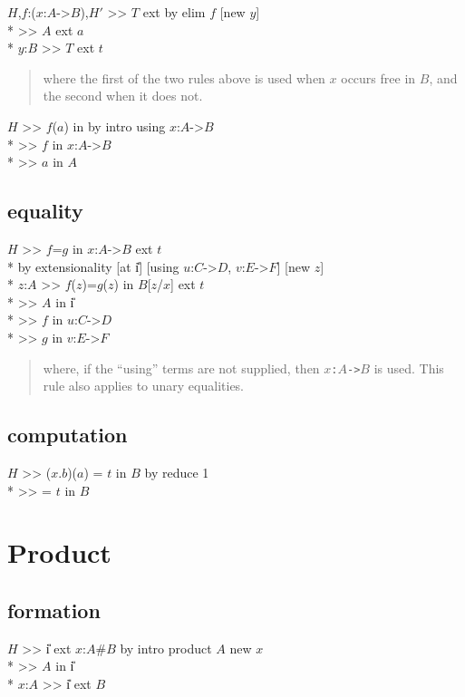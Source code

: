 \goalskip

\goal $H$,$f$:($x$:$A$->$B$),$H'$ >> $T$ ext 
             by elim $f$ [new $y$] \\*
\subgoal >> $A$ ext $a$ \\*
\subgoal $y$:$B$ >> $T$ ext $t$
\begin{quote}\rm
where the first of the two rules above is used when $x$ occurs free
in $B$, and the second when it
does not.
\end{quote}

\goal $H$ >> $f$($a$) in  by intro using $x$:$A$->$B$ \\*
\subgoal >> $f$ in $x$:$A$->$B$ \\*
\subgoal >> $a$ in $A$

\subsection*{equality}
\goal $H$ >> $f$=$g$ in $x$:$A$->$B$ ext $t$ \\*
\continuegoal by extensionality [at \U{i}] [using $u$:$C$->$D$, $v$:$E$->$F$] [new $z$] \\*
\subgoal   $z$:$A$ >> $f$($z$)=$g$($z$) in $B$[$z$/$x$] ext $t$ \\*
\subgoal       >> $A$ in \U{i}\\* 
\subgoal       >> $f$ in $u$:$C$->$D$\\*
\subgoal       >> $g$ in $v$:$E$->$F$
\begin{quote}\rm
where, if the ``using'' terms are not supplied, then {\tt $x$:$A$->$B$} is
used.  This rule also applies to unary equalities.
\end{quote}




\subsection*{computation}
\goal $H$ >> (\bs $x$.$b$)($a$) = $t$ in $B$ by reduce 1 \\*
\subgoal >>  = $t$ in $B$

\par


 
\section{Product}
\subsection*{formation}
\goal $H$ >> \U{i} ext $x$:$A$\#$B$  by intro product $A$ new $x$ \\*
\subgoal >> $A$ in \U{i} \\*
\subgoal $x$:$A$ >> \U{i} ext $B$


